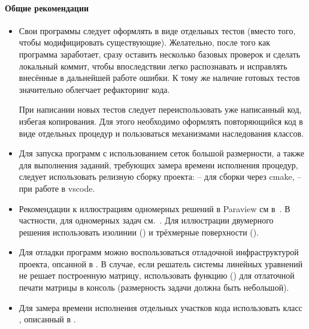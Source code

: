 
\paragraph{Общие рекомендации}
\begin{itemize}
\item 
Свои программы следует оформлять в виде отдельных тестов (вместо того, чтобы модифицировать существующие).
Желательно, после того как программа заработает, сразу оставить несколько базовых  проверок и
сделать локальный коммит, чтобы впоследствии легко распознавать и исправлять внесённые в дальнейшей работе ошибки.
К тому же наличие готовых тестов значительно облегчает рефакторинг кода.

При написании новых тестов следует переиспользовать уже написанный код, избегая копирования.
Для этого необходимо оформлять повторяющийся код в виде отдельных процедур и пользоваться механизмами наследования классов.

\item
Для запуска программ с использованием сеток большой размерности, а также для выполнения заданий, требующих
замера времени исполнения процедур, следует использовать релизную сборку проекта:
 -- для сборки через cmake,  -- при работе в vscode.

\item
Рекомендации к иллюстрациям одномерных решений в Paraview 
см в~. В частности, для одномерных задач см.~.
Для иллюстрации двумерного решения использовать изолинии () и трёхмерные поверхности ().

\item
Для отладки программ можно воспользоваться отладочной инфраструктурой проекта, опсанной в .
В случае, если решатель системы линейных уравнений не решает построенную матрицу, использовать функцию
 () для отлаточной печати матрицы в консоль (размерность задачи должна быть небольшой).

\item
Для замера времени исполнения отдельных участков кода использовать класс , описанный в .

\end{itemize}
